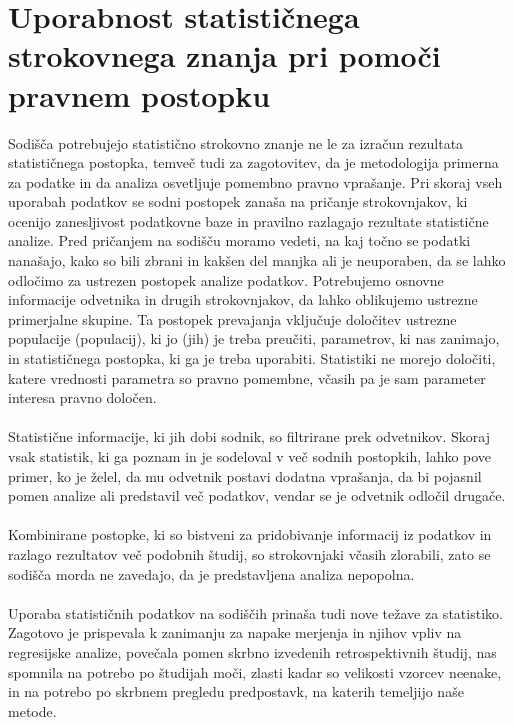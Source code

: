 \documentclass[12pt,a4paper]{amsart}
\theoremstyle{definition} %
\theoremstyle{plain} %
\begin{document}
\section{Uporabnost statističnega strokovnega znanja pri pomoči pravnem postopku}
Sodišča potrebujejo statistično strokovno znanje ne le za izračun rezultata statističnega postopka, temveč tudi za zagotovitev, da je metodologija 
primerna za podatke in da analiza osvetljuje pomembno pravno vprašanje. Pri skoraj vseh uporabah podatkov se sodni postopek zanaša na pričanje 
strokovnjakov, ki ocenijo zanesljivost podatkovne baze in pravilno razlagajo rezultate statistične analize. Pred pričanjem na sodišču moramo vedeti, 
na kaj točno se podatki nanašajo, kako so bili zbrani in kakšen del manjka ali je neuporaben, da se lahko odločimo za ustrezen postopek analize podatkov.
Potrebujemo osnovne informacije odvetnika in drugih strokovnjakov, da lahko oblikujemo ustrezne primerjalne skupine. Ta postopek prevajanja vključuje 
določitev ustrezne populacije (populacij), ki jo (jih) je treba preučiti, parametrov, ki nas zanimajo, in statističnega postopka, ki ga je treba uporabiti. 
Statistiki ne morejo določiti, katere vrednosti parametra so pravno pomembne, včasih pa je sam parameter interesa pravno določen.\\\\
Statistične informacije, ki jih dobi sodnik, so filtrirane prek odvetnikov. Skoraj vsak statistik, ki ga poznam in je sodeloval v več sodnih postopkih, 
lahko pove primer, ko je želel, da mu odvetnik postavi dodatna vprašanja, da bi pojasnil pomen analize ali predstavil več podatkov, vendar se je odvetnik 
odločil drugače.\\\\
Kombinirane postopke, ki so bistveni za pridobivanje informacij iz podatkov in razlago rezultatov več podobnih študij, so strokovnjaki včasih zlorabili, 
zato se sodišča morda ne zavedajo, da je predstavljena analiza nepopolna.\\\\
Uporaba statističnih podatkov na sodiščih prinaša tudi nove težave za statistiko. Zagotovo je prispevala k zanimanju za napake merjenja in njihov vpliv na 
regresijske analize, povečala pomen skrbno izvedenih retrospektivnih študij, nas spomnila na potrebo po študijah moči, zlasti kadar so velikosti 
vzorcev neenake, in na potrebo po skrbnem pregledu predpostavk, na katerih temeljijo naše metode. \\\\
\end{document}

